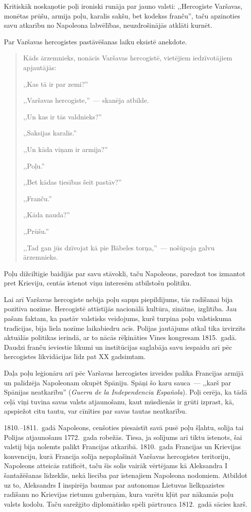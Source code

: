 \documentclass[twoside,a5paper,12pt,fleqn,openany]{extbook}
\newcommand{\estxti}[1]{\textit{\textspanish{#1}}}
\begin{document}
Kritiskāk noskaņotie poļi ironiski runāja par jauno valsti: ,,Hercogiste Varšavas, monētas prūšu, armija poļu, karalis sakšu, bet kodekss franču'', taču apzinoties savu atkarību no Napoleona labvēlības, neuzdrošinājās atklāti kurnēt.

Par Varšavas hercogistes pastāvēšanas laiku eksistē anekdote.

\begin{quote}
Kāds ārzemnieks, nonācis Varšavas hercogistē, vietējiem iedzīvotājiem apjautājās:

,,Kas tā ir par zemi?''

,,Varšavas hercogiste,''~--- skanēja atbilde.

,,Un kas ir tās valdnieks?''

,,Saksijas karalis.''

,,Un kāda viņam ir armija?''

,,Poļu.''

,,Bet kādas tiesības šeit pastāv?''

,,Franču.''

,,Kāda nauda?''

,,Prūšu.''

,,Tad gan jūs dzīvojat kā pie Bābeles torņa,''~--- nošūpoja galvu ārzemnieks.
\end{quote}


Poļu dižciltīgie baidījās par savu stāvokli, taču Napoleons, paredzot tos izmantot pret Krieviju, centās īstenot viņu interesēm atbilstošu politiku.

Lai arī Varšavas hercogiste nebija poļu sapņu piepildījums, tās radīšanai bija pozitīva nozīme. Hercogistē attīstījās nacionālā kultūra, zinātne, izglītība. Jau pašam faktam, ka pastāv valstisks veidojums, kurš turpina poļu valstiskuma tradīcijas, bija liela nozīme laikabiedru acīs. Polijas jautājums atkal tika izvirzīts aktuālās politikas ierindā, ar to nācās rēķināties Vīnes kongresam 1815.~gadā. Daudzi franču ieviestie likumi un institūcijas saglabāja savu iespaidu arī pēc hercogistes likvidācijas līdz pat XX gadsimtam.

Daļa poļu leģionāru arī pēc Varšavas hercogistes izveides palika Francijas armijā un palīdzēja Napoleonam okupēt Spāniju. Spāņi šo karu sauca~--- ,,karš par Spānijas neatkarību'' (\estxti{Guerra de la Independencia Española}). Poļi cerēja, ka tādā ceļā viņi tuvina savas valsts atjaunošanu, kaut mūsdienās ir grūti izprast, kā, apspiežot citu tautu, var cīnīties par savas tautas neatkarību.

1810.--1811.~gadā Napoleons, cenšoties piesaistīt savā pusē poļu šļahtu, solīja tai Polijas atjaunošanu 1772.~gada robežās. Tiesa, ja solījums arī tiktu īstenots, šai valstij bija nolemts palikt Francijas atkarībā. 1810.~gada Francijas un Krievijas konvenciju, kurā Francija solīja nepaplašināt Varšavas hercogistes teritoriju, Napoleons atteicās ratificēt, taču šis solis vairāk vērtējams kā Aleksandra I šantažēšanas līdzeklis, nekā liecība par īstenajiem Napoleona nodomiem. Atbildot uz to, Aleksandrs I inspirēja baumas par autonomas Lietuvas lielkņazistes radīšanu no Krievijas rietumu guberņām, kura varētu kļūt par nākamās poļu valsts kodolu. Taču sarežģīto diplomātisko spēli pārtrauca 1812.~gadā sācies karš.
\end{document}
